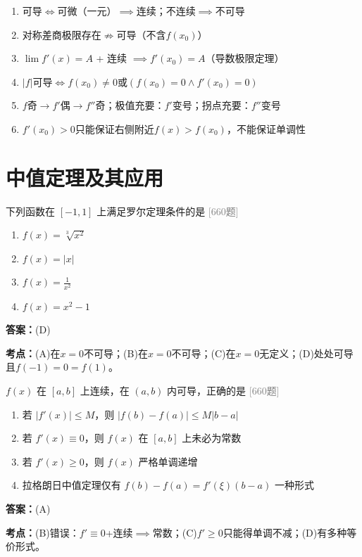\documentclass[12pt,a4paper]{ctexbook}
\newcommand{\src}[1]{\hfill\textcolor{gray}{\small\textsf{[#1]}}}
\newcommand{\ans}[1]{\begin{answerbox}\textbf{答案：}#1\end{answerbox}}
\newcommand{\kpt}[1]{\textbf{考点：}#1}
\begin{document}
\begin{tcolorbox}[colback=blue!5, colframe=blue!30, title=\textbf{导数与微分·核心结论}]
\begin{enumerate}[nosep]
  \item 可导$\iff$可微（一元）$\implies$连续；不连续$\implies$不可导
  \item 对称差商极限存在$\not\Rightarrow$可导（不含$f(x_0)$）
  \item $\lim f'(x)=A$ + 连续 $\implies f'(x_0)=A$（导数极限定理）
  \item $|f|$可导$\iff f(x_0)\neq 0$或$(f(x_0)=0\land f'(x_0)=0)$
  \item $f$奇$\to f'$偶$\to f''$奇；极值充要：$f'$变号；拐点充要：$f''$变号
  \item $f'(x_0)>0$只能保证右侧附近$f(x)>f(x_0)$，不能保证单调性
\end{enumerate}
\end{tcolorbox}

\newpage

\chapter{中值定理及其应用}

\begin{exercise}[660题·罗尔定理条件]
下列函数在 $[-1,1]$ 上满足罗尔定理条件的是 \hfill\src{660题}
\begin{enumerate}[label=(\Alph*),nosep]
  \item $f(x)=\sqrt[3]{x^2}$
  \item $f(x)=|x|$
  \item $f(x)=\frac{1}{x^2}$
  \item $f(x)=x^2-1$
\end{enumerate}
\end{exercise}
\ans{(D)}
\kpt{(A)在$x=0$不可导；(B)在$x=0$不可导；(C)在$x=0$无定义；(D)处处可导且$f(-1)=0=f(1)$。}

\bigskip

\begin{exercise}[660题·拉格朗日中值定理推论]
$f(x)$ 在 $[a,b]$ 上连续，在 $(a,b)$ 内可导，正确的是 \hfill\src{660题}
\begin{enumerate}[label=(\Alph*),nosep]
  \item 若 $|f'(x)|\leqslant M$，则 $|f(b)-f(a)|\leqslant M|b-a|$
  \item 若 $f'(x)\equiv 0$，则 $f(x)$ 在 $[a,b]$ 上未必为常数
  \item 若 $f'(x)\geqslant 0$，则 $f(x)$ 严格单调递增
  \item 拉格朗日中值定理仅有 $f(b)-f(a)=f'(\xi)(b-a)$ 一种形式
\end{enumerate}
\end{exercise}
\ans{(A)}
\kpt{(B)错误：$f'\equiv 0$+连续$\implies$常数；(C)$f'\geqslant 0$只能得单调不减；(D)有多种等价形式。}
\end{document}
